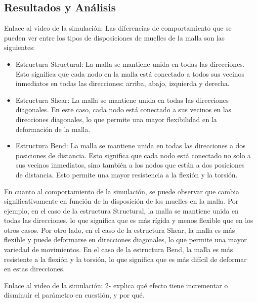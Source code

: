 \documentclass{article}
\begin{document}
\subsection{Resultados y Análisis}\label{sec:fb-resultados}

Enlace al video de la simulación: \url{}
Las diferencias de comportamiento que se pueden ver entre los tipos de disposiciones de muelles de la malla son las siguientes:
\begin{itemize}
    \item Estructura Structural: La malla se mantiene unida en todas las direcciones. Esto significa que cada nodo en la malla está conectado a todos sus vecinos inmediatos en todas las direcciones: arriba, abajo, izquierda y derecha.
    \item Estructura Shear: La malla se mantiene unida en todas las direcciones diagonales. En este caso, cada nodo está conectado a sus vecinos en las direcciones diagonales, lo que permite una mayor flexibilidad en la deformación de la malla.
    \item Estructura Bend: La malla se mantiene unida en todas las direcciones a dos posiciones de distancia. Esto significa que cada nodo está conectado no solo a sus vecinos inmediatos, sino también a los nodos que están a dos posiciones de distancia. Esto permite una mayor resistencia a la flexión y la torsión.
\end{itemize}

En cuanto al comportamiento de la simulación, se puede observar que cambia significativamente en función de la disposición de los muelles en la malla. 
Por ejemplo, en el caso de la estructura Structural, la malla se mantiene unida en todas las direcciones, lo que significa que es más rígida y 
menos flexible que en los otros casos. 
Por otro lado, en el caso de la estructura Shear, la malla es más flexible y puede deformarse en direcciones diagonales, lo que permite 
una mayor variedad de movimientos. 
En el caso de la estructura Bend, la malla es más resistente a la flexión y la torsión, lo que significa que es más difícil de deformar en estas direcciones.

Enlace al video de la simulación: \url{}
2- explica qué efecto tiene incrementar o disminuir el parámetro en
cuestión, y por qué.
\end{document}
